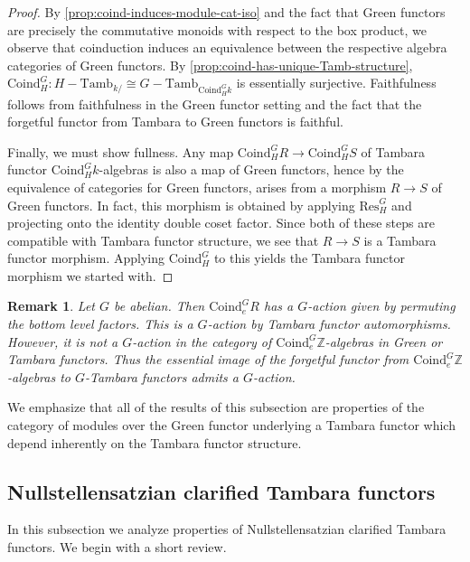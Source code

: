 \documentclass[11pt,dvipsnames]{amsart}
\newcommand{\Z}{\mathbb{Z}}
\theoremstyle{BoldRemark}
\newtheorem{remark}[theorem]{Remark}
\newcommand{\Tamb}{\mathrm{Tamb}}
\begin{document}
\begin{proof}
	By \cref{prop:coind-induces-module-cat-iso} and the fact that Green functors are precisely the commutative monoids with respect to the box product, we observe that coinduction induces an equivalence between the respective algebra categories of Green functors. By \cref{prop:coind-has-unique-Tamb-structure}, $\mathrm{Coind}_H^G : H {-} \Tamb_{k/} \cong G {-} \Tamb_{\mathrm{Coind}_H^G k}$ is essentially surjective. Faithfulness follows from faithfulness in the Green functor setting and the fact that the forgetful functor from Tambara to Green functors is faithful.
	
	Finally, we must show fullness. Any map $\mathrm{Coind}_H^G R \rightarrow \mathrm{Coind}_H^G S$ of Tambara functor $\mathrm{Coind}_H^G k$-algebras is also a map of Green functors, hence by the equivalence of categories for Green functors, arises from a morphism $R \rightarrow S$ of Green functors. In fact, this morphism is obtained by applying $\mathrm{Res}_H^G$ and projecting onto the identity double coset factor. Since both of these steps are compatible with Tambara functor structure, we see that $R \rightarrow S$ is a Tambara functor morphism. Applying $\mathrm{Coind}_H^G$ to this yields the Tambara functor morphism we started with.
\end{proof}

\begin{remark}
	Let $G$ be abelian. Then $\mathrm{Coind}_e^G R$ has a $G$-action given by permuting the bottom level factors. This is a $G$-action by Tambara functor automorphisms. However, it is \emph{not} a $G$-action in the category of $\mathrm{Coind}_e^G \Z$-algebras in Green or Tambara functors. Thus the essential image of the forgetful functor from $\mathrm{Coind}_e^G \Z$-algebras to $G$-Tambara functors admits a $G$-action.
\end{remark}

We emphasize that all of the results of this subsection are properties of the category of modules over the Green functor underlying a Tambara functor which depend inherently on the Tambara functor structure.

\subsection{Nullstellensatzian clarified Tambara functors}\label{subsec:NSS}

In this subsection we analyze properties of Nullstellensatzian clarified Tambara functors. We begin with a short review.
\end{document}
